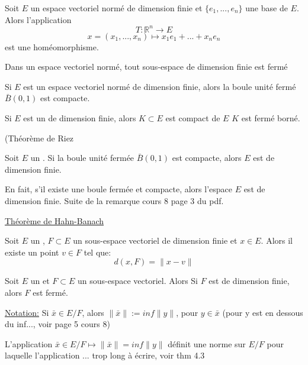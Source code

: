\documentclass[12pt,a4paper]{article}
\begin{document}
\begin{flushleft}
\begin{thm}
Soit $E$ un espace vectoriel normé de dimension finie et $ \{e_1, ..., e_n \}$ une base de $E$. Alors l'application $$T: \mathbb{R}^n \longrightarrow E$$ $$x = (x_1, ..., x_n) \mapsto x_1 e_1 + ... + x_n e_n$$ est une homéomorphisme.
\end{thm}

\begin{cor} 
Dans un espace vectoriel normé, tout sous-espace de dimension finie est fermé
\end{cor}

\begin{thm}
Si $E$ est un espace vectoriel normé de dimension finie, alors la boule unité fermé $\bar{B} (0,1)$ est compacte.
\end{thm}

\begin{thm}
Si $E$ est un \evn de dimension finie, alors $K \subset E$ est compact de $E$ \ssi $K$ est fermé borné.
\end{thm}

(Théorème de Riez
\begin{thm}
Soit $E$ un \evn . Si la boule unité fermée $\bar{B}(0,1)$ est compacte, alors $E$ est de dimension finie.
\end{thm}

\begin{rq}
En fait, s'il existe une boule fermée et compacte, alors l'espace $E$ est de dimension finie. Suite de la remarque cours 8 page 3 du pdf.
\end{rq}


\underline{Théorème de Hahn-Banach}
\begin{thm}
Soit $E$ un \evn , $F \subset E$ un sous-espace vectoriel de dimension finie et $x \in E$. Alors il existe un point $v \in F$ tel que: $$d(x,F) = \lVert x - v \rVert$$
\end{thm}


\begin{thm}
Soit $E$ un \evn et $F \subset E$ un sous-espace vectoriel. Alors Si $F$ est de dimension finie, alors $F$ est fermé.
\end{thm}

\underline{Notation:}
Si $\bar{x} \in E/F$, alors $\lVert \bar{x} \rVert := inf \lVert y \rVert$, pour $y \in \bar{x}$ (pour y est en dessous du inf..., voir page 5 cours 8)

\begin{thm}
L'application $\bar{x} \in E/F \mapsto \lVert \bar{x} \rVert = inf \lVert y \rVert$ définit une norme sur $E/F$ pour laquelle l'application ... trop long à écrire, voir thm 4.3
\end{thm}


\end{flushleft}
\end{document}
